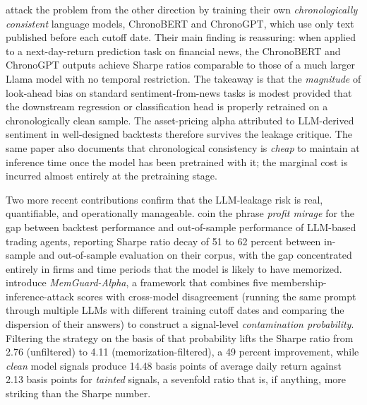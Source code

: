 \cite{he2025chronologically} attack the problem from the other direction by training their own \textit{chronologically consistent} language models, ChronoBERT and ChronoGPT, which use only text published before each cutoff date. Their main finding is reassuring: when applied to a next-day-return prediction task on financial news, the ChronoBERT and ChronoGPT outputs achieve Sharpe ratios comparable to those of a much larger Llama model with no temporal restriction. The takeaway is that the \textit{magnitude} of look-ahead bias on standard sentiment-from-news tasks is modest provided that the downstream regression or classification head is properly retrained on a chronologically clean sample. The asset-pricing alpha attributed to LLM-derived sentiment in well-designed backtests therefore survives the leakage critique. The same paper also documents that chronological consistency is \textit{cheap} to maintain at inference time once the model has been pretrained with it; the marginal cost is incurred almost entirely at the pretraining stage.

Two more recent contributions confirm that the LLM-leakage risk is real, quantifiable, and operationally manageable. \cite{li2025profitmirage} coin the phrase \textit{profit mirage} for the gap between backtest performance and out-of-sample performance of LLM-based trading agents, reporting Sharpe ratio decay of 51 to 62 percent between in-sample and out-of-sample evaluation on their corpus, with the gap concentrated entirely in firms and time periods that the model is likely to have memorized. \cite{roy2026memguard} introduce \textit{MemGuard-Alpha}, a framework that combines five membership-inference-attack scores with cross-model disagreement (running the same prompt through multiple LLMs with different training cutoff dates and comparing the dispersion of their answers) to construct a signal-level \textit{contamination probability}. Filtering the strategy on the basis of that probability lifts the Sharpe ratio from 2.76 (unfiltered) to 4.11 (memorization-filtered), a 49 percent improvement, while \textit{clean} model signals produce 14.48 basis points of average daily return against 2.13 basis points for \textit{tainted} signals, a sevenfold ratio that is, if anything, more striking than the Sharpe number.

